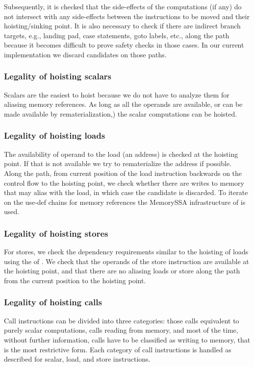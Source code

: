 \documentclass[acmlarge,review,anonymous]{acmart}\settopmatter{printfolios=true}
\begin{document}
Subsequently, it is checked that the side-effects of the computations (if any)
do not intersect with any side-effects between the instructions to be
moved and their hoisting/sinking point. It is also necessary to check if
there are indirect branch targets, e.g., landing pad, case statements, goto
labels, etc., along the path because it becomes difficult to prove safety checks
in those cases. In our current implementation we discard candidates on those
paths.

\subsubsection{Legality of hoisting scalars}
Scalars are the easiest to hoist because we do not have to analyze them for
aliasing memory references. As long as all the operands are available, or can be
made available by rematerialization,) the scalar computations can be hoisted.

\subsubsection{Legality of hoisting loads}
The availability of operand to the load (an address) is checked at the hoisting
point. If that is not available we try to rematerialize the address if
possible.  Along the path, from current position of the load instruction
backwards on the control flow to the hoisting point, we check whether there are
writes to memory that may alias with the load, in which case the candidate is
discarded. To iterate on the use-def chains for memory references the MemorySSA
infrastructure of \LLVM{} is used.

\subsubsection{Legality of hoisting stores}
For stores, we check the dependency requirements similar to the hoisting of
loads using the \MemorySSA{} of \LLVM{}. We check that the operands of the store
instruction are available at the hoisting point, and that there are no aliasing
loads or store along the path from the current position to the hoisting point.

\subsubsection{Legality of hoisting calls}
Call instructions can be divided into three categories: those calls equivalent
to purely scalar computations, calls reading from memory, and most of the time,
without further information, calls have to be classified as writing to memory,
that is the most restrictive form.  Each category of call instructions is
handled as described for scalar, load, and store instructions.
\end{document}
